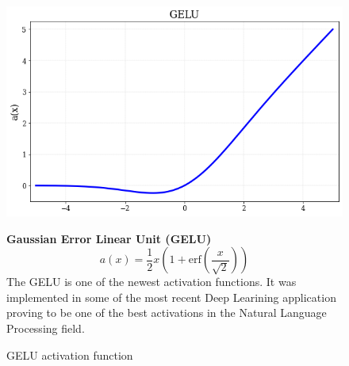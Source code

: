 \begin{figure}[!h]
\begin{minipage}{0.45\textwidth}
    \centering
\includegraphics[width=\textwidth]{sections/03/Images/GELU.png}
\caption{GELU activation function}
    \label{fig:gelu}
\end{minipage}
\hfill
\begin{minipage}{0.5\textwidth}
    \textbf{Gaussian Error Linear Unit (GELU)}
   \begin{equation}
       a(x) = \frac{1}{2} x \left( 1+\text{erf} \left( \frac{x}{\sqrt{2}}\right)\right)
   \end{equation}
   The GELU\cite{gelu} is one of the newest activation functions. It was implemented in some of the most recent Deep Learining application proving to be one of the best activations in the Natural Language Processing field\cite{bert,gpt}. 
\end{minipage}
\end{figure}  


